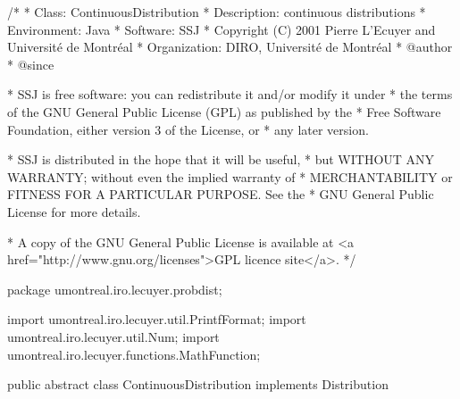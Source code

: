 \begin{code}
\begin{hide}
/*
 * Class:        ContinuousDistribution
 * Description:  continuous distributions
 * Environment:  Java
 * Software:     SSJ 
 * Copyright (C) 2001  Pierre L'Ecuyer and Université de Montréal
 * Organization: DIRO, Université de Montréal
 * @author       
 * @since

 * SSJ is free software: you can redistribute it and/or modify it under
 * the terms of the GNU General Public License (GPL) as published by the
 * Free Software Foundation, either version 3 of the License, or
 * any later version.

 * SSJ is distributed in the hope that it will be useful,
 * but WITHOUT ANY WARRANTY; without even the implied warranty of
 * MERCHANTABILITY or FITNESS FOR A PARTICULAR PURPOSE.  See the
 * GNU General Public License for more details.

 * A copy of the GNU General Public License is available at
   <a href="http://www.gnu.org/licenses">GPL licence site</a>.
 */
\end{hide}
package umontreal.iro.lecuyer.probdist;
\begin{hide}
import umontreal.iro.lecuyer.util.PrintfFormat;
import umontreal.iro.lecuyer.util.Num;
import umontreal.iro.lecuyer.functions.MathFunction;
\end{hide}

public abstract class ContinuousDistribution implements Distribution \begin{hide} {
   @Deprecated
   public int decPrec = 15;

   private int getDecPrec() {
      return decPrec;
   }\end{hide}
\end{code}
